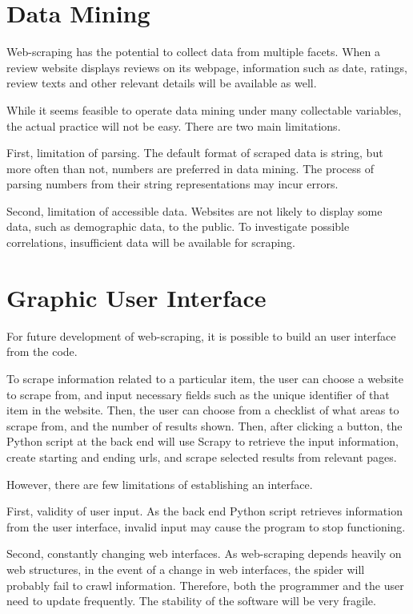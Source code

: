 \documentclass[12pt]{report}
\begin{document}
\section{Data Mining}

Web-scraping has the potential to collect data from multiple facets. When a review website displays reviews on its webpage, information such as date, ratings, review texts and other relevant details will be available as well. 

While it seems feasible to operate data mining under many collectable variables, the actual practice will not be easy. There are two main limitations.

First, limitation of parsing. The default format of scraped data is string, but more often than not, numbers are preferred in data mining. The process of parsing numbers from their string representations may incur errors.

Second, limitation of accessible data. Websites are not likely to display some data, such as demographic data, to the public. To investigate possible correlations, insufficient data will be available for scraping.


\section{Graphic User Interface}

For future development of web-scraping, it is possible to build an user interface from the code. 

To scrape information related to a particular item, the user can choose a website to scrape from, and input necessary fields such as the unique identifier of that item in the website. Then, the user can choose from a checklist of what areas to scrape from, and the number of results shown. Then, after clicking a button, the Python script at the back end will use Scrapy to retrieve the input information, create starting and ending urls, and scrape selected results from relevant pages.

However, there are few limitations of establishing an interface.

First, validity of user input. As the back end Python script retrieves information from the user interface, invalid input may cause the program to stop functioning.

Second, constantly changing web interfaces. As web-scraping depends heavily on web structures, in the event of a change in web interfaces, the spider will probably fail to crawl information. Therefore, both the programmer and the user need to update frequently. The stability of the software will be very fragile.

\newpage
\begin{appendices}
\printglossaries
\end{appendices}
\end{document}
